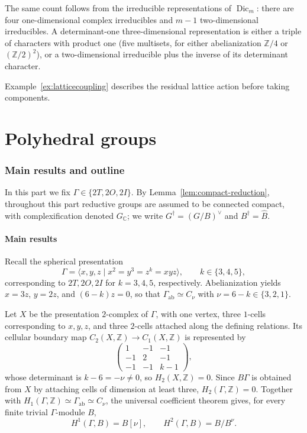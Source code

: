 \documentclass[11pt,a4paper,reqno]{amsart}
\theoremstyle{plain}
\theoremstyle{definition}
\theoremstyle{remark}
\numberwithin{equation}{section}
\newcommand{\CC}{\mathbb C}
\newcommand{\ZZ}{\mathbb Z}
\newcommand{\Dic}{\operatorname{Dic}}
\begin{document}
The same count follows from the irreducible representations of $\Dic_m$: there are four one-dimensional complex irreducibles and $m-1$ two-dimensional irreducibles. A determinant-one three-dimensional representation is either a triple of characters with product one (five multisets, for either abelianization $\ZZ/4$ or $(\ZZ/2)^2$), or a two-dimensional irreducible plus the inverse of its determinant character.

Example~\ref{ex:latticecoupling} describes the residual lattice action before taking components.

\clearpage
\part{Polyhedral groups}\label{part:polyhedral}

\section{Main results and outline}\label{sec:polyhedral-setup}

In this part we fix $\Gamma\in\{2T,2O,2I\}$. By Lemma~\ref{lem:compact-reduction}, throughout this part reductive groups are assumed to be connected compact, with complexification denoted $G_{\CC}$; we write $G^\dagger=(G/B)^\vee$ and $B^\dagger=\widehat B$.

\subsection{Main results}
Recall the spherical presentation
\[
\Gamma=\langle x,y,z\mid x^2=y^3=z^k=xyz\rangle,\qquad k\in\{3,4,5\},
\]
corresponding to $2T,2O,2I$ for $k=3,4,5$, respectively. Abelianization yields $x=3z$, $y=2z$, and $(6-k)z=0$, so that $\Gamma_{\mathrm{ab}}\simeq C_\nu$ with $\nu=6-k\in\{3,2,1\}$.

Let $X$ be the presentation $2$-complex of $\Gamma$, with one vertex, three $1$-cells corresponding to $x,y,z$, and three $2$-cells attached along the defining relations. Its cellular boundary map $C_2(X,\ZZ)\to C_1(X,\ZZ)$ is represented by
\[
\begin{pmatrix}
1 & -1 & -1\\
-1 & 2 & -1\\
-1 & -1 & k-1
\end{pmatrix},
\]
whose determinant is $k-6=-\nu\ne 0$, so $H_2(X,\ZZ)=0$. Since $B\Gamma$ is obtained from $X$ by attaching cells of dimension at least three, $H_2(\Gamma,\ZZ)=0$. Together with $H_1(\Gamma,\ZZ)\simeq\Gamma_{\mathrm{ab}}\simeq C_\nu$, the universal coefficient theorem gives, for every finite trivial $\Gamma$-module $B$,
\begin{equation}\label{eq:polyhedral-cohomology}
H^1(\Gamma,B)=B[\nu],\qquad H^2(\Gamma,B)=B/B^\nu.
\end{equation}
\end{document}
